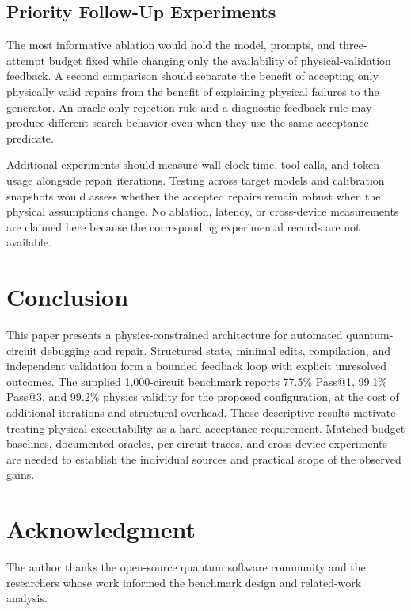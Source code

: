 \documentclass[conference]{IEEEtran}
\begin{document}
\subsection{Priority Follow-Up Experiments}
The most informative ablation would hold the model, prompts, and three-attempt budget fixed while changing only the availability of physical-validation feedback. A second comparison should separate the benefit of accepting only physically valid repairs from the benefit of explaining physical failures to the generator. An oracle-only rejection rule and a diagnostic-feedback rule may produce different search behavior even when they use the same acceptance predicate.

Additional experiments should measure wall-clock time, tool calls, and token usage alongside repair iterations. Testing across target models and calibration snapshots would assess whether the accepted repairs remain robust when the physical assumptions change. No ablation, latency, or cross-device measurements are claimed here because the corresponding experimental records are not available.

\section{Conclusion}
This paper presents a physics-constrained architecture for automated quantum-circuit debugging and repair. Structured state, minimal edits, compilation, and independent validation form a bounded feedback loop with explicit unresolved outcomes. The supplied 1,000-circuit benchmark reports 77.5\% Pass@1, 99.1\% Pass@3, and 99.2\% physics validity for the proposed configuration, at the cost of additional iterations and structural overhead. These descriptive results motivate treating physical executability as a hard acceptance requirement. Matched-budget baselines, documented oracles, per-circuit traces, and cross-device experiments are needed to establish the individual sources and practical scope of the observed gains.

\section*{Acknowledgment}
The author thanks the open-source quantum software community and the researchers whose work informed the benchmark design and related-work analysis.
\end{document}
